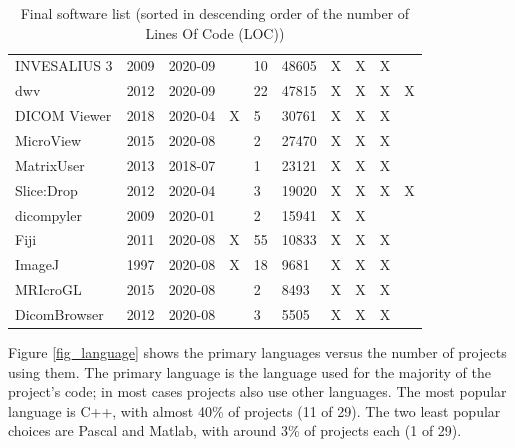 \documentclass[final, 3p, times, authoryear]{elsarticle}
\begin{document}
\begin{table}[!ht]
\begin{tabular}{p{6cm}lllllllll}
INVESALIUS 3 \citep{Amorim2015} & 2009 & 2020-09 &  & 10 & 48605 & X & X & X &  \\
dwv \citep{Martelli2021} & 2012 & 2020-09 &  & 22 & 47815 & X & X & X & X \\
DICOM Viewer \citep{Afsar2021} & 2018 & 2020-04 & X & 5 & 30761 & X & X & X &  \\
MicroView \citep{ParallaxInnovations2020} & 2015 & 2020-08 &  & 2 & 27470 & X & X & X &  \\
MatrixUser \citep{Liu2016} & 2013 & 2018-07 &  & 1 & 23121 & X & X & X &  \\
Slice:Drop \citep{Haehn2013} & 2012 & 2020-04 &  & 3 & 19020 & X & X & X & X \\
dicompyler \citep{Panchal2010} & 2009 & 2020-01 &  & 2 & 15941 & X & X &  &  \\
Fiji \citep{Schindelin2012} & 2011 & 2020-08 & X & 55 & 10833 & X & X & X &  \\
ImageJ \citep{Rueden2017} & 1997 & 2020-08 & X & 18 & 9681 & X & X & X &  \\
MRIcroGL \citep{Rorden2021} & 2015 & 2020-08 &  & 2 & 8493 & X & X & X &  \\
DicomBrowser \citep{Archie2012} & 2012 & 2020-08 &  & 3 & 5505 & X & X & X &  \\ \hline
\end{tabular}
\caption{Final software list (sorted in descending order of the number of Lines
Of Code (LOC))}
\label{tab_final_list}
\end{table}

Figure \ref{fig_language} shows the primary languages versus the number of
projects using them.  The primary language is the language used for the majority
of the project's code; in most cases projects also use other languages.  The
most popular language is C++, with almost 40\% of projects (11 of 29).  The two
least popular choices are Pascal and Matlab, with around 3\% of projects each
(1 of 29).
\end{document}
